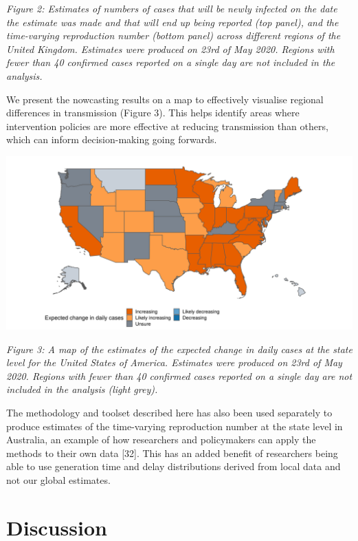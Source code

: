 \documentclass[]{article}
\begin{document}
\emph{Figure 2: Estimates of numbers of cases that will be newly
infected on the date the estimate was made and that will end up being
reported (top panel), and the time-varying reproduction number (bottom
panel) across different regions of the United Kingdom. Estimates were
produced on 23rd of May 2020. Regions with fewer than 40 confirmed cases
reported on a single day are not included in the analysis.}

We present the nowcasting results on a map to effectively visualise
regional differences in transmission (Figure 3). This helps identify
areas where intervention policies are more effective at reducing
transmission than others, which can inform decision-making going
forwards.

\includegraphics[width=0.9\linewidth]{figures/figure_3}

\emph{Figure 3: A map of the estimates of the expected change in daily
cases at the state level for the United States of America. Estimates
were produced on 23rd of May 2020. Regions with fewer than 40 confirmed
cases reported on a single day are not included in the analysis (light
grey).}

The methodology and toolset described here has also been used separately
to produce estimates of the time-varying reproduction number at the
state level in Australia, an example of how researchers and policymakers
can apply the methods to their own data {[}32{]}. This has an added
benefit of researchers being able to use generation time and delay
distributions derived from local data and not our global estimates.

\hypertarget{discussion}{%
\section{Discussion}\label{discussion}}
\end{document}
